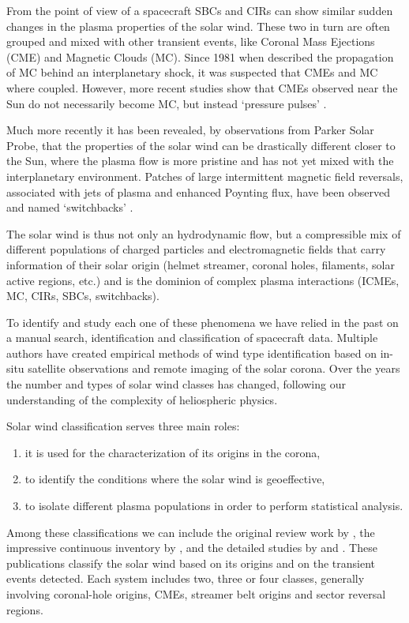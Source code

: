 From the point of view of a spacecraft SBCs and CIRs can show similar sudden changes in the plasma properties of the solar wind. These two in turn are often grouped and mixed with other transient events, like Coronal Mass Ejections (CME) and Magnetic Clouds (MC). Since 1981 when \citep{Burlaga1981} described the propagation of MC behind an interplanetary shock, it was suspected that CMEs and MC where coupled. However, more recent studies show that CMEs observed near the Sun do not necessarily become MC, but instead `pressure pulses' \citep{Gopalswamy1998,Wu2006}.

Much more recently it has been revealed, by observations from Parker Solar Probe, that the properties of the solar wind can be drastically different closer to the Sun, where the plasma flow is more pristine and has not yet mixed with the interplanetary environment. Patches of large intermittent magnetic field reversals, associated with jets of plasma and enhanced Poynting flux, have been observed and named `switchbacks' \citep{Bale2019,Bandyopadhyay2020}.

The solar wind is thus not only an hydrodynamic flow, but a compressible mix of different populations of charged particles and electromagnetic fields that carry information of their solar origin (helmet streamer, coronal holes, filaments, solar active regions, etc.) and is the dominion of complex plasma interactions (ICMEs, MC, CIRs, SBCs, switchbacks).

To identify and study each one of these phenomena we have relied in the past on a manual search, identification and classification of spacecraft data. Multiple authors have created empirical methods of wind type identification based on in-situ satellite observations and remote imaging of the solar corona. Over the years the number and types of solar wind classes has changed, following our understanding of the complexity of heliospheric physics.

Solar wind classification serves three main roles:
\begin{enumerate}
	\item it is used for the characterization of its origins in the corona,
	\item to identify the conditions where the solar wind is geoeffective,
	\item to isolate different plasma populations in order to perform statistical analysis.
\end{enumerate}

Among these classifications we can include the original review work by \citep{Withbroe1986}, the impressive continuous inventory by \citep{Richardson2000,Richardson2010,Richardson2012}, and the detailed studies by \citep{Zhao2009} and \citep{Xu2015b}. These publications classify the solar wind based on its origins and on the transient events detected. Each system includes two, three or four classes, generally involving coronal-hole origins, CMEs, streamer belt origins and sector reversal regions.

